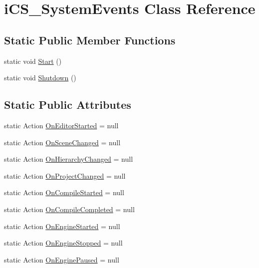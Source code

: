 \hypertarget{classi_c_s___system_events}{\section{i\+C\+S\+\_\+\+System\+Events Class Reference}
\label{classi_c_s___system_events}
}
\subsection*{Static Public Member Functions}
\begin{DoxyCompactItemize}
\item 
static void \hyperlink{classi_c_s___system_events_ad788a0599abd67c7ca3c93d3930d4254}{Start} ()
\item 
static void \hyperlink{classi_c_s___system_events_a2e4cb4fe9d07ab11f3cb1cbb9d9c6f95}{Shutdown} ()
\end{DoxyCompactItemize}
\subsection*{Static Public Attributes}
\begin{DoxyCompactItemize}
\item 
static Action \hyperlink{classi_c_s___system_events_a6b9b162a4d1a9d773aa00a92499c5672}{On\+Editor\+Started} = null
\item 
static Action \hyperlink{classi_c_s___system_events_aa6e1d8e2332f39d8146bbd4812c876cd}{On\+Scene\+Changed} = null
\item 
static Action \hyperlink{classi_c_s___system_events_ac75646d6a6d6e3ae064d8624ae9c5375}{On\+Hierarchy\+Changed} = null
\item 
static Action \hyperlink{classi_c_s___system_events_a57251f221e9d9b1c154ce7ceb60a0f8a}{On\+Project\+Changed} = null
\item 
static Action \hyperlink{classi_c_s___system_events_a3ffced2361d71a4776609f100a54d010}{On\+Compile\+Started} = null
\item 
static Action \hyperlink{classi_c_s___system_events_aab0661932933129471b45b7cd42ec936}{On\+Compile\+Completed} = null
\item 
static Action \hyperlink{classi_c_s___system_events_a02a666dba32b8af96dcc2e90a5c2c18c}{On\+Engine\+Started} = null
\item 
static Action \hyperlink{classi_c_s___system_events_a34cb873cbf1d19e166503cd8a302bef9}{On\+Engine\+Stopped} = null
\item 
static Action \hyperlink{classi_c_s___system_events_a2e411329cc28135ecadddb797d5dfc3d}{On\+Engine\+Paused} = null
\end{DoxyCompactItemize}
